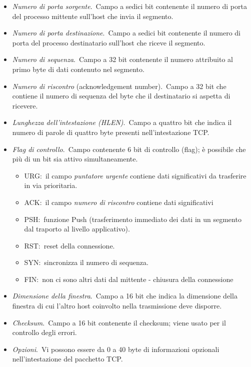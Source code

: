 \begin{itemize}
    \item \emph{Numero di porta sorgente}.\
          Campo a sedici bit contenente il numero di porta del processo mittente sull'host che invia il segmento.
    \item \emph{Numero di porta destinazione}.\
          Campo a sedici bit contenente il numero di porta del processo destinatario sull'host che riceve il segmento.
    \item \emph{Numero di sequenza}.\
          Campo a 32 bit contenente il numero attribuito al primo byte di dati contenuto nel segmento.
    \item \emph{Numero di riscontro} (acknowledgement number).\
          Campo a 32 bit che contiene il numero di sequenza del byte che il destinatario si aspetta di ricevere.
    \item \emph{Lunghezza dell'intestazione (HLEN)}.\
          Campo a quattro bit che indica il numero di parole di quattro byte presenti nell'intestazione TCP.
    \item \emph{Flag di controllo}.\
          Campo contenente 6 bit di controllo (flag); è possibile che più di un bit sia attivo simultaneamente.
          \begin{itemize}
              \item URG:\ il campo \emph{puntatore urgente} contiene dati significativi da trasferire in via prioritaria.
              \item ACK:\ il campo \emph{numero di riscontro} contiene dati significativi
              \item PSH:\ funzione Push (trasferimento immediato dei dati in un segmento dal traporto al livello applicativo).
              \item RST:\ reset della connessione.
              \item SYN:\ sincronizza il numero di sequenza.
              \item FIN:\ non ci sono altri dati dal mittente - chiusura della connessione
          \end{itemize}
    \item \emph{Dimensione della finestra}.\
          Campo a 16 bit che indica la dimensione della finestra di cui l'altro host coinvolto nella trasmissione deve disporre.
    \item \emph{Checksum}.\
          Campo a 16 bit contenente il checksum; viene usato per il controllo degli errori.
    \item \emph{Opzioni}.\
          Vi possono essere da 0 a 40 byte di informazioni opzionali nell'intestazione del pacchetto TCP.
\end{itemize}

